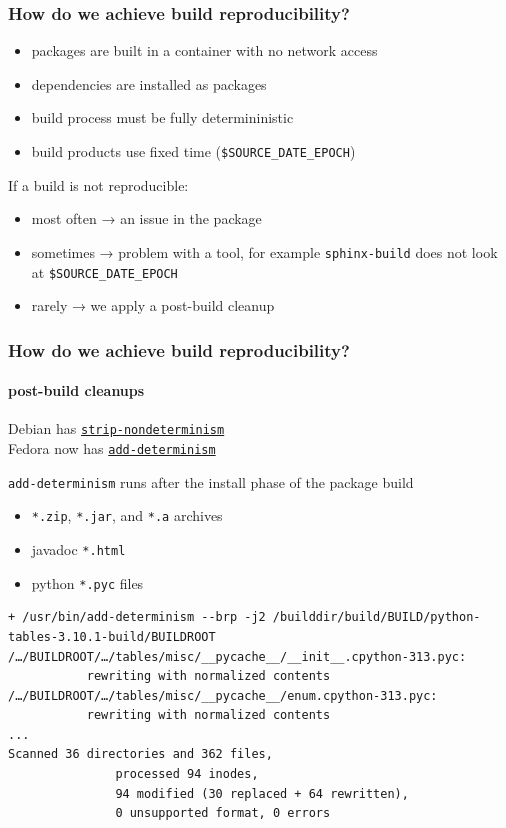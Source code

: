 \documentclass[]{beamer}
\begin{document}
\begin{frame}
  \frametitle{How do we achieve build reproducibility?}

  \begin{itemize}
  \item packages are built in a container with no network access
  \item dependencies are installed as packages
  \item build process must be fully determininistic
  \item build products use fixed time (\texttt{\$SOURCE\_DATE\_EPOCH})
  \end{itemize}

  \vfill
  \pause

  If a build is not reproducible:
  \begin{itemize}
  \item most often → an issue in the package
  \item sometimes → problem with a tool, for example \texttt{sphinx-build} does not look at \texttt{\$SOURCE\_DATE\_EPOCH}
  \item rarely → we apply a post-build cleanup
  \end{itemize}
\end{frame}

\begin{frame}[fragile]
  \frametitle{How do we achieve build reproducibility?}
  \framesubtitle{post-build cleanups}

  \vfill
  \pause

  Debian has \href{https://packages.debian.org/sid/dh-strip-nondeterminism}{\texttt{strip-nondeterminism}}\\
  Fedora now has \href{https://github.com/keszybz/add-determinism}{\texttt{add-determinism}}\\

  \vfill
  \pause

  \texttt{add-determinism} runs after the install phase of the package build

  \vfill

  \begin{itemize}
    \item \texttt{*.zip}, \texttt{*.jar}, and \texttt{*.a} archives
    \item javadoc \texttt{*.html}
    \item python \texttt{*.pyc} files
  \end{itemize}

  \vfill
  \pause
  
  {\tiny
  \begin{verbatim}
+ /usr/bin/add-determinism --brp -j2 /builddir/build/BUILD/python-tables-3.10.1-build/BUILDROOT    
/…/BUILDROOT/…/tables/misc/__pycache__/__init__.cpython-313.pyc:
           rewriting with normalized contents
/…/BUILDROOT/…/tables/misc/__pycache__/enum.cpython-313.pyc:
           rewriting with normalized contents
...
Scanned 36 directories and 362 files,
               processed 94 inodes,
               94 modified (30 replaced + 64 rewritten),
               0 unsupported format, 0 errors
  \end{verbatim}
  }
\end{frame}
\end{document}
